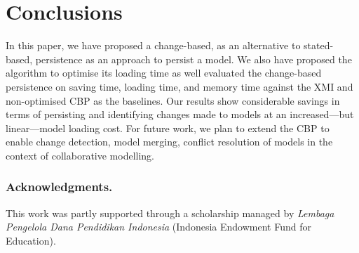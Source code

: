 \documentclass{llncs}
\begin{document}
\section{Conclusions}
\label{sec:conclusions}
In this paper, we have proposed a change-based, as an alternative to stated-based, persistence as an approach to persist a model. We also have proposed the algorithm to optimise its loading time as well evaluated the change-based persistence on saving time, loading time, and memory time against the XMI and non-optimised CBP as the baselines. Our results show considerable savings in terms of persisting and identifying changes made to models at an increased---but linear---model loading cost. For future work, we  plan to extend the CBP to enable change detection, model merging, conflict resolution of models in the context of collaborative modelling.

\subsubsection*{Acknowledgments.} This work was partly supported through a scholarship managed by \emph{Lembaga Pengelola Dana Pendidikan Indonesia} (Indonesia Endowment Fund for Education).

 

\end{document}
